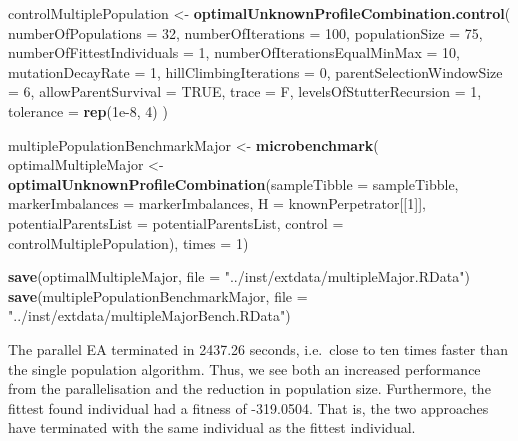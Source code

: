 \documentclass[]{article}
\newenvironment{Shaded}{\begin{snugshade}}{\end{snugshade}}
\newcommand{\KeywordTok}[1]{\textcolor[rgb]{0.13,0.29,0.53}{\textbf{#1}}}
\newcommand{\DataTypeTok}[1]{\textcolor[rgb]{0.13,0.29,0.53}{#1}}
\newcommand{\DecValTok}[1]{\textcolor[rgb]{0.00,0.00,0.81}{#1}}
\newcommand{\FloatTok}[1]{\textcolor[rgb]{0.00,0.00,0.81}{#1}}
\newcommand{\StringTok}[1]{\textcolor[rgb]{0.31,0.60,0.02}{#1}}
\newcommand{\OtherTok}[1]{\textcolor[rgb]{0.56,0.35,0.01}{#1}}
\newcommand{\NormalTok}[1]{#1}
\begin{document}
\begin{Shaded}
\begin{Highlighting}[]
\NormalTok{controlMultiplePopulation <-}\StringTok{ }
\StringTok{    }\KeywordTok{optimalUnknownProfileCombination.control}\NormalTok{(}
        \DataTypeTok{numberOfPopulations =} \DecValTok{32}\NormalTok{, }\DataTypeTok{numberOfIterations =} \DecValTok{100}\NormalTok{,}
        \DataTypeTok{populationSize =} \DecValTok{75}\NormalTok{, }\DataTypeTok{numberOfFittestIndividuals =} \DecValTok{1}\NormalTok{,}
        \DataTypeTok{numberOfIterationsEqualMinMax =} \DecValTok{10}\NormalTok{,}
        \DataTypeTok{mutationDecayRate =} \DecValTok{1}\NormalTok{, }\DataTypeTok{hillClimbingIterations =} \DecValTok{0}\NormalTok{, }
        \DataTypeTok{parentSelectionWindowSize =} \DecValTok{6}\NormalTok{,}
        \DataTypeTok{allowParentSurvival =} \OtherTok{TRUE}\NormalTok{, }\DataTypeTok{trace =}\NormalTok{ F, }
        \DataTypeTok{levelsOfStutterRecursion =} \DecValTok{1}\NormalTok{, }
        \DataTypeTok{tolerance =} \KeywordTok{rep}\NormalTok{(}\FloatTok{1e-8}\NormalTok{, }\DecValTok{4}\NormalTok{)}
\NormalTok{    )}

\NormalTok{multiplePopulationBenchmarkMajor <-}\StringTok{ }\KeywordTok{microbenchmark}\NormalTok{(}
\NormalTok{    optimalMultipleMajor <-}\StringTok{ }
\StringTok{        }\KeywordTok{optimalUnknownProfileCombination}\NormalTok{(}\DataTypeTok{sampleTibble =}\NormalTok{ sampleTibble, }
                                         \DataTypeTok{markerImbalances =}\NormalTok{ markerImbalances, }
                                         \DataTypeTok{H =}\NormalTok{ knownPerpetrator[[}\DecValTok{1}\NormalTok{]], }
                                         \DataTypeTok{potentialParentsList =}\NormalTok{ potentialParentsList, }
                                         \DataTypeTok{control =}\NormalTok{ controlMultiplePopulation),}
    \DataTypeTok{times =} \DecValTok{1}\NormalTok{)}

\KeywordTok{save}\NormalTok{(optimalMultipleMajor, }\DataTypeTok{file =} \StringTok{"../inst/extdata/multipleMajor.RData"}\NormalTok{)}
\KeywordTok{save}\NormalTok{(multiplePopulationBenchmarkMajor, }\DataTypeTok{file =} \StringTok{"../inst/extdata/multipleMajorBench.RData"}\NormalTok{)}
\end{Highlighting}
\end{Shaded}

The parallel EA terminated in 2437.26 seconds, i.e.~close to ten times
faster than the single population algorithm. Thus, we see both an
increased performance from the parallelisation and the reduction in
population size. Furthermore, the fittest found individual had a fitness
of -319.0504. That is, the two approaches have terminated with the same
individual as the fittest individual.
\end{document}
